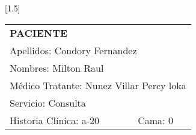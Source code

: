\documentclass[10pt,a4paper]{article}
\begin{document}
 
\begin{minipage}{10cm}
\end{minipage}
\hfill
\begin{minipage}{10cm}
\begin{flushleft}
\scalebox{1.4}[1.5]{
\begin{tabular}{|p{3cm}p{2.3cm}|}
\hline 
\multicolumn{2}{|l|}{\scriptsize{\textbf{PACIENTE}}}\\
\multicolumn{2}{|p{5.3cm}|}{\scriptsize{Apellidos: Condory Fernandez}}\\ 
\multicolumn{2}{|p{5.3cm}|}{\scriptsize{Nombres: Milton Raul}}\\ 
\multicolumn{2}{|p{5.3cm}|}{\scriptsize{M\'edico Tratante: Nunez Villar Percy loka}}\\ 
\hline 
\multicolumn{2}{|p{5.3cm}|}{\scriptsize{Servicio: Consulta}}\\
\hline 
\scriptsize{Historia Cl\'inica: a-20}&\scriptsize{Cama: 0} \\ 
\hline 
\end{tabular}}
\end{flushleft}
\end{minipage}
\end{document}
